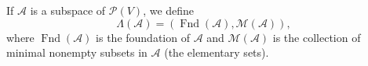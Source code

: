 If $\mathcal{A}$ is a subspace of $\mathcal{P}(V)$, we define
$$\Lambda(\mathcal{A}) = (\operatorname{Fnd}(\mathcal{A}), \mathcal{M}(\mathcal{A})),$$
where $\operatorname{Fnd}(\mathcal{A})$ is the foundation of $\mathcal{A}$ and $\mathcal{M}(\mathcal{A})$ is the collection of minimal nonempty subsets in $\mathcal{A}$ (the elementary sets).
